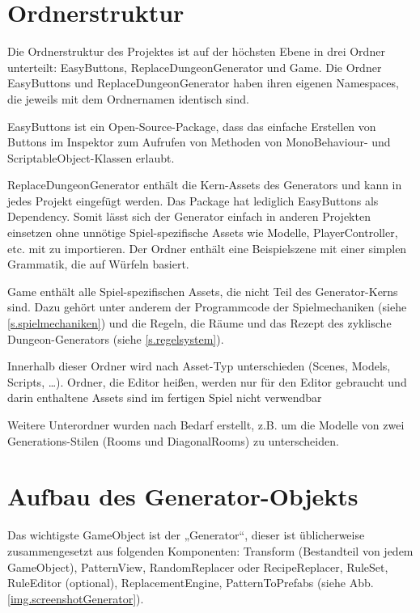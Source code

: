 \section{Ordnerstruktur}

Die Ordnerstruktur des Projektes ist auf der höchsten Ebene in drei Ordner unterteilt: EasyButtons, ReplaceDungeonGenerator und Game. Die Ordner EasyButtons und ReplaceDungeonGenerator haben ihren eigenen Namespaces, die jeweils mit dem Ordnernamen identisch sind.

EasyButtons ist ein Open-Source-Package, dass das einfache Erstellen von Buttons im Inspektor zum Aufrufen von Methoden von MonoBehaviour- und ScriptableObject-Klassen erlaubt. \cite{easyButtons}

ReplaceDungeonGenerator enthält die Kern-Assets des Generators und kann in jedes Projekt eingefügt werden. Das Package hat lediglich EasyButtons als Dependency. Somit lässt sich der Generator einfach in anderen Projekten einsetzen ohne unnötige Spiel-spezifische Assets wie Modelle, PlayerController, etc. mit zu importieren. Der Ordner enthält eine Beispielszene mit einer simplen Grammatik, die auf Würfeln basiert.

Game enthält alle Spiel-spezifischen Assets, die nicht Teil des Generator-Kerns sind. Dazu gehört unter anderem der Programmcode der Spielmechaniken (siehe \ref{s.spielmechaniken}) und die Regeln, die Räume und das Rezept des zyklische Dungeon-Generators (siehe \ref{s.regelsystem}).

Innerhalb dieser Ordner wird nach Asset-Typ unterschieden (Scenes, Models, Scripts, \dots). Ordner, die Editor heißen, werden nur für den Editor gebraucht und darin enthaltene Assets sind im fertigen Spiel nicht verwendbar \cite[Seite: SpecialFolders]{unityManual}

Weitere Unterordner wurden nach Bedarf erstellt, z.B. um die Modelle von zwei Generations-Stilen (Rooms und DiagonalRooms) zu unterscheiden.

\section{Aufbau des Generator-Objekts}

Das wichtigste GameObject ist der „Generator“, dieser ist üblicherweise zusammengesetzt aus folgenden Komponenten: 
Transform (Bestandteil von jedem GameObject), PatternView, RandomReplacer oder RecipeReplacer, RuleSet, RuleEditor (optional), ReplacementEngine, PatternToPrefabs (siehe Abb. \ref{img.screenshotGenerator}). 

